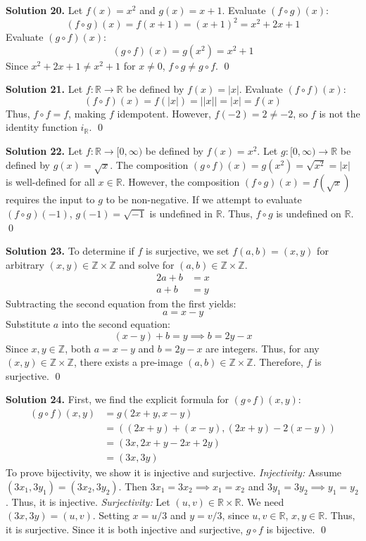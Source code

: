 \documentclass[11pt, letterpaper]{article}
\theoremstyle{definition}
\theoremstyle{remark}
\newcommand{\R}{\mathbb{R}}
\newcommand{\Z}{\mathbb{Z}}
\begin{document}
\textbf{Solution 20.}
Let $f(x) = x^2$ and $g(x) = x + 1$. 
Evaluate $(f \circ g)(x)$:
\[
(f \circ g)(x) = f(x + 1) = (x + 1)^2 = x^2 + 2x + 1
\]
Evaluate $(g \circ f)(x)$:
\[
(g \circ f)(x) = g(x^2) = x^2 + 1
\]
Since $x^2 + 2x + 1 \neq x^2 + 1$ for $x \neq 0$, $f \circ g \neq g \circ f$.
\qed

\textbf{Solution 21.}
Let $f: \R \to \R$ be defined by $f(x) = |x|$. 
Evaluate $(f \circ f)(x)$:
\[
(f \circ f)(x) = f(|x|) = ||x|| = |x| = f(x)
\]
Thus, $f \circ f = f$, making $f$ idempotent. However, $f(-2) = 2 \neq -2$, so $f$ is not the identity function $i_\R$.
\qed

\textbf{Solution 22.}
Let $f: \R \to [0, \infty)$ be defined by $f(x) = x^2$. 
Let $g: [0, \infty) \to \R$ be defined by $g(x) = \sqrt{x}$. 
The composition $(g \circ f)(x) = g(x^2) = \sqrt{x^2} = |x|$ is well-defined for all $x \in \R$. 
However, the composition $(f \circ g)(x) = f(\sqrt{x})$ requires the input to $g$ to be non-negative. If we attempt to evaluate $(f \circ g)(-1)$, $g(-1) = \sqrt{-1}$ is undefined in $\R$. Thus, $f \circ g$ is undefined on $\R$.
\qed

\textbf{Solution 23.}
To determine if $f$ is surjective, we set $f(a, b) = (x, y)$ for arbitrary $(x, y) \in \Z \times \Z$ and solve for $(a, b) \in \Z \times \Z$.
\begin{align*}
2a + b &= x \\
a + b &= y
\end{align*}
Subtracting the second equation from the first yields:
\[
a = x - y
\]
Substitute $a$ into the second equation:
\[
(x - y) + b = y \implies b = 2y - x
\]
Since $x, y \in \Z$, both $a = x - y$ and $b = 2y - x$ are integers. Thus, for any $(x, y) \in \Z \times \Z$, there exists a pre-image $(a, b) \in \Z \times \Z$. Therefore, $f$ is surjective.
\qed

\textbf{Solution 24.}
First, we find the explicit formula for $(g \circ f)(x, y)$:
\begin{align*}
(g \circ f)(x, y) &= g(2x + y, x - y) \\
&= ((2x + y) + (x - y), (2x + y) - 2(x - y)) \\
&= (3x, 2x + y - 2x + 2y) \\
&= (3x, 3y)
\end{align*}
To prove bijectivity, we show it is injective and surjective.
\textit{Injectivity:} Assume $(3x_1, 3y_1) = (3x_2, 3y_2)$. Then $3x_1 = 3x_2 \implies x_1 = x_2$ and $3y_1 = 3y_2 \implies y_1 = y_2$. Thus, it is injective.
\textit{Surjectivity:} Let $(u, v) \in \R \times \R$. We need $(3x, 3y) = (u, v)$. Setting $x = u/3$ and $y = v/3$, since $u, v \in \R$, $x, y \in \R$. Thus, it is surjective.
Since it is both injective and surjective, $g \circ f$ is bijective.
\qed
\end{document}
